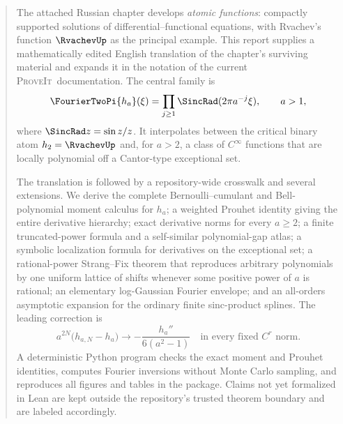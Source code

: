 \documentclass[11pt,oneside]{article}
\numberwithin{equation}{section}
\theoremstyle{definition}
\theoremstyle{remark}
\newcommand{\repo}{\textsc{ProveIt}}
\begin{document}
\begin{abstract}
The attached Russian chapter develops \emph{atomic functions}: compactly supported
solutions of differential--functional equations, with Rvachev's function
$\RvachevUp$ as the principal example.  This report supplies a mathematically edited
English translation of the chapter's surviving material and expands it in the
notation of the current \repo\ documentation.  The central family is
\[
  \FourierTwoPi{h_a}(\xi)=\prod_{j\ge 1}\SincRad(2\pi a^{-j}\xi),\qquad a>1,
\]
where $\SincRad z=\sin z/z$.  It interpolates between the critical binary atom
$h_2=\RvachevUp$ and, for $a>2$, a class of $C^\infty$ functions that are locally
polynomial off a Cantor-type exceptional set.

The translation is followed by a repository-wide crosswalk and several
extensions.  We derive the complete Bernoulli--cumulant and Bell-polynomial
moment calculus for $h_a$; a weighted Prouhet identity giving the entire
derivative hierarchy; exact derivative norms for every $a\ge2$; a finite
truncated-power formula and a self-similar polynomial-gap atlas; a symbolic
localization formula for derivatives on the exceptional set; a rational-power
Strang--Fix theorem that reproduces arbitrary polynomials by one uniform lattice
of shifts whenever some positive power of $a$ is rational; an elementary
log-Gaussian Fourier envelope; and an all-orders asymptotic expansion for the
ordinary finite sinc-product splines.  The leading correction is
\[
 a^{2N}\bigl(h_{a,N}-h_a\bigr)
 \longrightarrow -\frac{h_a''}{6(a^2-1)}
 \quad\text{in every fixed }C^r\text{ norm}.
\]
A deterministic Python program checks the exact moment and Prouhet identities,
computes Fourier inversions without Monte Carlo sampling, and reproduces all
figures and tables in the package.  Claims not yet formalized in Lean are kept
outside the repository's trusted theorem boundary and are labeled accordingly.


\end{abstract}
\end{document}
